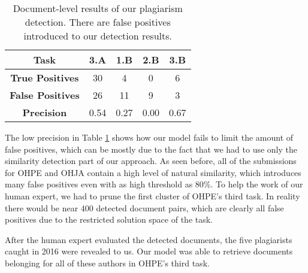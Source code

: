 \newpage


\begin{table}[ht]
\centering
\caption{Document-level results of our plagiarism detection. There are false positives introduced to our detection results.}
\begin{tabular}{|c|c|c|c|c|}
\hline
\bf Task      & 3.A   & 1.B   & 2.B & 3.B   \\ \hline
\bf True Positives        & 30   & 4    & 0  & 6    \\ \hline
\bf False Positives        & 26   & 11   & 9  & 3    \\ \hline
\bf Precision & 0.54 & 0.27 & 0.00  & 0.67 \\ \hline
\end{tabular}
\label{tbl-plgdet-final-res}
\end{table}

\noindent
The low precision in Table \ref{tbl-plgdet-final-res} shows how our model fails to limit the amount of false positives, which can be mostly due to the fact that we had to use only the similarity detection part of our approach. As seen before, all of the submissions for OHPE and OHJA contain a high level of natural similarity, which introduces many false positives even with as high threshold as 80\%. To help the work of our human expert, we had to prune the first cluster of OHPE's third task. In reality there would be near 400 detected document pairs, which are clearly all false positives due to the restricted solution space of the task.


After the human expert evaluated the detected documents, the five plagiarists caught in 2016 were revealed to us. Our model was able to retrieve documents belonging for all of these authors in OHPE's third task. 
